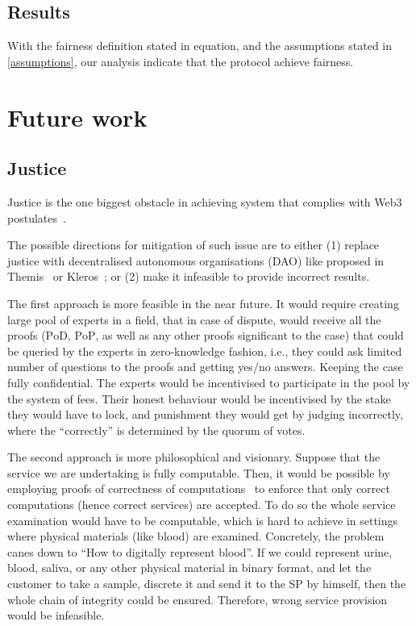 \documentclass{ieeeaccess}
\begin{document}
\subsection{Results}\label{results}

With the fairness definition stated in equation, and the assumptions stated in \ref{assumptions}, our analysis indicate that the protocol achieve fairness.



\section{Future work}\label{future-work}
\subsection{Justice}\label{justice}

Justice is the one biggest obstacle in achieving system that complies with Web3 postulates~\cite{Web3Wiki71}.

The possible directions for mitigation of such issue are to either (1) replace justice with decentralised autonomous organisations (DAO) like proposed in Themis~\cite{meng2019themis} or Kleros~\cite{lesaege2018kleros}; or (2) make it infeasible to provide incorrect results.

The first approach is more feasible in the near future. It would require creating large pool of experts in a field, that in case of dispute, would receive all the proofs ($\mathrm{PoD}$, $\mathrm{PoP}$, as well as any other proofs significant to the case) that could be queried by the experts in zero-knowledge fashion, i.e., they could ask limited number of questions to the proofs and getting yes/no answers. Keeping the case fully confidential. The experts would be incentivised to participate in the pool by the system of fees. Their honest behaviour would be incentivised by the stake they would have to lock, and punishment they would get by judging incorrectly, where the ``correctly'' is determined by the quorum of votes.

The second approach is more philosophical and visionary. Suppose that the service we are undertaking is fully computable. Then, it would be possible by employing proofs of correctness of computations~\cite{ben2013snarks} to enforce that only correct computations (hence correct services) are accepted. To do so the whole service examination would have to be computable, which is hard to achieve in settings where physical materials (like blood) are examined. Concretely, the problem canes down to ``How to digitally represent blood''. If we could represent urine, blood, saliva, or any other physical material in binary format, and let the customer to take a sample, discrete it and send it to the SP by himself, then the whole chain of integrity could be ensured. Therefore, wrong service provision would be infeasible.
\end{document}
